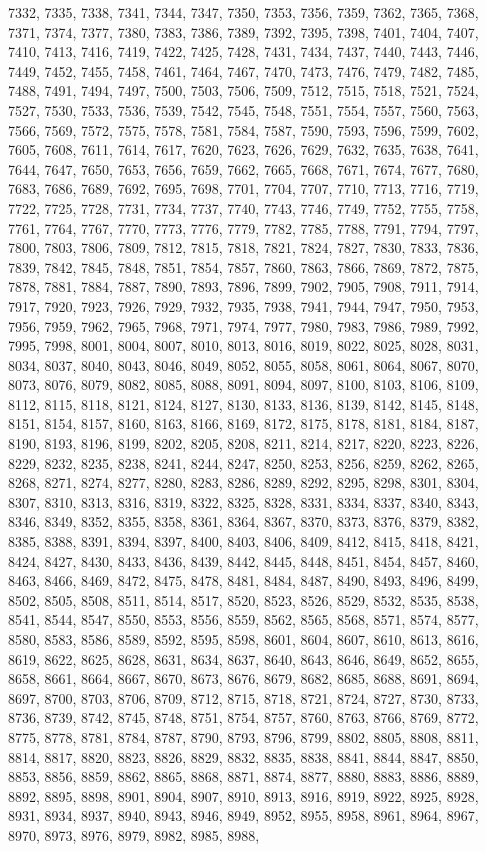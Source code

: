 \documentclass[../Cours.tex]{subfiles}
\begin{document}
\begin{questions}
7332, 7335, 7338, 7341, 7344, 7347, 7350, 7353, 7356, 7359, 7362, 7365, 7368, 7371, 7374, 7377, 7380, 7383, 7386, 7389, 7392, 7395, 7398, 7401, 7404, 7407, 7410, 7413, 7416, 7419, 7422, 7425, 7428, 7431, 7434, 7437, 7440, 7443, 7446, 7449, 7452, 7455, 7458, 7461, 7464, 7467, 7470, 7473, 7476, 7479, 7482, 7485, 7488, 7491, 7494, 7497, 7500, 7503, 7506, 7509, 7512, 7515, 7518, 7521, 7524, 7527, 7530, 7533, 7536, 7539, 7542, 7545, 7548, 7551, 7554, 7557, 7560, 7563, 7566, 7569, 7572, 7575, 7578, 7581, 7584, 7587, 7590, 7593, 7596, 7599, 7602, 7605, 7608, 7611, 7614, 7617, 7620, 7623, 7626, 7629, 7632, 7635, 7638, 7641, 7644, 7647, 7650, 7653, 7656, 7659, 7662, 7665, 7668, 7671, 7674, 7677, 7680, 7683, 7686, 7689, 7692, 7695, 7698, 7701, 7704, 7707, 7710, 7713, 7716, 7719, 7722, 7725, 7728, 7731, 7734, 7737, 7740, 7743, 7746, 7749, 7752, 7755, 7758, 7761, 7764, 7767, 7770, 7773, 7776, 7779, 7782, 7785, 7788, 7791, 7794, 7797, 7800, 7803, 7806, 7809, 7812, 7815, 7818, 7821, 7824, 7827, 7830, 7833, 7836, 7839, 7842, 7845, 7848, 7851, 7854, 7857, 7860, 7863, 7866, 7869, 7872, 7875, 7878, 7881, 7884, 7887, 7890, 7893, 7896, 7899, 7902, 7905, 7908, 7911, 7914, 7917, 7920, 7923, 7926, 7929, 7932, 7935, 7938, 7941, 7944, 7947, 7950, 7953, 7956, 7959, 7962, 7965, 7968, 7971, 7974, 7977, 7980, 7983, 7986, 7989, 7992, 7995, 7998, 8001, 8004, 8007, 8010, 8013, 8016, 8019, 8022, 8025, 8028, 8031, 8034, 8037, 8040, 8043, 8046, 8049, 8052, 8055, 8058, 8061, 8064, 8067, 8070, 8073, 8076, 8079, 8082, 8085, 8088, 8091, 8094, 8097, 8100, 8103, 8106, 8109, 8112, 8115, 8118, 8121, 8124, 8127, 8130, 8133, 8136, 8139, 8142, 8145, 8148, 8151, 8154, 8157, 8160, 8163, 8166, 8169, 8172, 8175, 8178, 8181, 8184, 8187, 8190, 8193, 8196, 8199, 8202, 8205, 8208, 8211, 8214, 8217, 8220, 8223, 8226, 8229, 8232, 8235, 8238, 8241, 8244, 8247, 8250, 8253, 8256, 8259, 8262, 8265, 8268, 8271, 8274, 8277, 8280, 8283, 8286, 8289, 8292, 8295, 8298, 8301, 8304, 8307, 8310, 8313, 8316, 8319, 8322, 8325, 8328, 8331, 8334, 8337, 8340, 8343, 8346, 8349, 8352, 8355, 8358, 8361, 8364, 8367, 8370, 8373, 8376, 8379, 8382, 8385, 8388, 8391, 8394, 8397, 8400, 8403, 8406, 8409, 8412, 8415, 8418, 8421, 8424, 8427, 8430, 8433, 8436, 8439, 8442, 8445, 8448, 8451, 8454, 8457, 8460, 8463, 8466, 8469, 8472, 8475, 8478, 8481, 8484, 8487, 8490, 8493, 8496, 8499, 8502, 8505, 8508, 8511, 8514, 8517, 8520, 8523, 8526, 8529, 8532, 8535, 8538, 8541, 8544, 8547, 8550, 8553, 8556, 8559, 8562, 8565, 8568, 8571, 8574, 8577, 8580, 8583, 8586, 8589, 8592, 8595, 8598, 8601, 8604, 8607, 8610, 8613, 8616, 8619, 8622, 8625, 8628, 8631, 8634, 8637, 8640, 8643, 8646, 8649, 8652, 8655, 8658, 8661, 8664, 8667, 8670, 8673, 8676, 8679, 8682, 8685, 8688, 8691, 8694, 8697, 8700, 8703, 8706, 8709, 8712, 8715, 8718, 8721, 8724, 8727, 8730, 8733, 8736, 8739, 8742, 8745, 8748, 8751, 8754, 8757, 8760, 8763, 8766, 8769, 8772, 8775, 8778, 8781, 8784, 8787, 8790, 8793, 8796, 8799, 8802, 8805, 8808, 8811, 8814, 8817, 8820, 8823, 8826, 8829, 8832, 8835, 8838, 8841, 8844, 8847, 8850, 8853, 8856, 8859, 8862, 8865, 8868, 8871, 8874, 8877, 8880, 8883, 8886, 8889, 8892, 8895, 8898, 8901, 8904, 8907, 8910, 8913, 8916, 8919, 8922, 8925, 8928, 8931, 8934, 8937, 8940, 8943, 8946, 8949, 8952, 8955, 8958, 8961, 8964, 8967, 8970, 8973, 8976, 8979, 8982, 8985, 8988, 
\end{questions}
\end{document}
